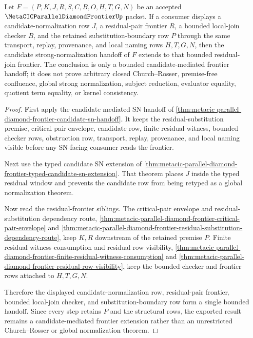 \begin{theorem}
\label{thm:metacic-parallel-diamond-frontier-candidate-sn-frontier-extension}
Let $F=(P,K,J,R,S,C,B,O,H,T,G,N)$ be an accepted $\MetaCICParallelDiamondFrontierUp$ packet. If a consumer displays a candidate-normalization row $J$, a residual-pair frontier $R$, a bounded local-join checker $B$, and the retained substitution-boundary row $P$ through the same transport, replay, provenance, and local naming rows $H,T,G,N$, then the candidate strong-normalization handoff of $F$ extends to that bounded residual-join frontier. The conclusion is only a bounded candidate-mediated frontier handoff; it does not prove arbitrary closed Church--Rosser, premise-free confluence, global strong normalization, subject reduction, evaluator equality, quotient term equality, or kernel consistency.
\end{theorem}
\begin{proof}
First apply the candidate-mediated SN handoff of \autoref{thm:metacic-parallel-diamond-frontier-candidate-sn-handoff}. It keeps the residual-substitution premise, critical-pair envelope, candidate row, finite residual witness, bounded checker rows, obstruction row, transport, replay, provenance, and local naming visible before any SN-facing consumer reads the frontier.

Next use the typed candidate SN extension of \autoref{thm:metacic-parallel-diamond-frontier-typed-candidate-sn-extension}. That theorem places $J$ inside the typed residual window and prevents the candidate row from being retyped as a global normalization theorem.

Now read the residual-frontier siblings. The critical-pair envelope and residual-substitution dependency route, \autoref{thm:metacic-parallel-diamond-frontier-critical-pair-envelope} and \autoref{thm:metacic-parallel-diamond-frontier-residual-substitution-dependency-route}, keep $K,R$ downstream of the retained premise $P$. Finite residual witness consumption and residual-row visibility, \autoref{thm:metacic-parallel-diamond-frontier-finite-residual-witness-consumption} and \autoref{thm:metacic-parallel-diamond-frontier-residual-row-visibility}, keep the bounded checker and frontier rows attached to $H,T,G,N$.

Therefore the displayed candidate-normalization row, residual-pair frontier, bounded local-join checker, and substitution-boundary row form a single bounded handoff. Since every step retains $P$ and the structural rows, the exported result remains a candidate-mediated frontier extension rather than an unrestricted Church--Rosser or global normalization theorem.
\end{proof}

